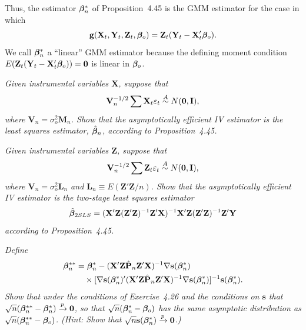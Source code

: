 Thus, the estimator $\boldsymbol{\beta}_n^*$ of Proposition~4.45 is the GMM estimator for
the case in which
\[
\mathbf{g}(\mathbf{X}_t, \mathbf{Y}_t, \mathbf{Z}_t, \boldsymbol{\beta}_o) = \mathbf{Z}_t(\mathbf{Y}_t - \mathbf{X}_t'\boldsymbol{\beta}_o).
\]
We call $\boldsymbol{\beta}_n^*$ a ``linear'' GMM estimator because the defining moment condition $E(\mathbf{Z}_t(\mathbf{Y}_t - \mathbf{X}_t'\boldsymbol{\beta}_o)) = \mathbf{0}$ is linear in $\boldsymbol{\beta}_o$.

\begin{exercises}
\item\label{ex:4.46} \textit{Given instrumental variables\/ $\mathbf{X}$, suppose that}
\[
\mathbf{V}_n^{-1/2}\sum \mathbf{X}_t\varepsilon_t \overset{A}{\sim} N(\mathbf{0}, \mathbf{I}),
\]
\textit{where $\mathbf{V}_n = \sigma_o^2\mathbf{M}_n$. Show that the asymptotically efficient IV estimator is the least squares estimator, $\hat{\boldsymbol{\beta}}_n$, according to Proposition~4.45.}

\item\label{ex:4.47} \textit{Given instrumental variables\/ $\mathbf{Z}$, suppose that}
\[
\mathbf{V}_n^{-1/2}\sum \mathbf{Z}_t\varepsilon_t \overset{A}{\sim} N(\mathbf{0}, \mathbf{I}),
\]
\textit{where $\mathbf{V}_n = \sigma_o^2\mathbf{L}_n$ and $\mathbf{L}_n \equiv E(\mathbf{Z}'\mathbf{Z}/n)$. Show that the asymptotically
efficient IV estimator is the two-stage least squares estimator}
\[
\tilde{\boldsymbol{\beta}}_{2SLS} = (\mathbf{X}'\mathbf{Z}(\mathbf{Z}'\mathbf{Z})^{-1}\mathbf{Z}'\mathbf{X})^{-1}\mathbf{X}'\mathbf{Z}(\mathbf{Z}'\mathbf{Z})^{-1}\mathbf{Z}'\mathbf{Y}
\]
\textit{according to Proposition~4.45.}

\item\label{ex:4.48} \textit{Define}
\begin{align*}
\boldsymbol{\beta}_n^{**} &= \boldsymbol{\beta}_n^* - (\mathbf{X}'\mathbf{Z}\hat{\mathbf{P}}_n\mathbf{Z}'\mathbf{X})^{-1}\nabla \mathbf{s}(\boldsymbol{\beta}_n^*) \\
&\quad\times[\nabla \mathbf{s}(\boldsymbol{\beta}_n^*)'(\mathbf{X}'\mathbf{Z}\hat{\mathbf{P}}_n\mathbf{Z}'\mathbf{X})^{-1}\nabla \mathbf{s}(\boldsymbol{\beta}_n^*)]^{-1}\mathbf{s}(\boldsymbol{\beta}_n^*).
\end{align*}
\textit{Show that under the conditions of Exercise~4.26 and the conditions on\/ $\mathbf{s}$
that $\sqrt{n}(\boldsymbol{\beta}_n^{**} - \boldsymbol{\beta}_n^*) \xrightarrow{p} \mathbf{0}$, so that $\sqrt{n}(\boldsymbol{\beta}_n^* - \boldsymbol{\beta}_o)$ has the same asymptotic
distribution as $\sqrt{n}(\boldsymbol{\beta}_n^{**} - \boldsymbol{\beta}_o)$. (Hint: Show that $\sqrt{n}\mathbf{s}(\boldsymbol{\beta}_n^*) \xrightarrow{p} \mathbf{0}$.)}
\end{exercises}

